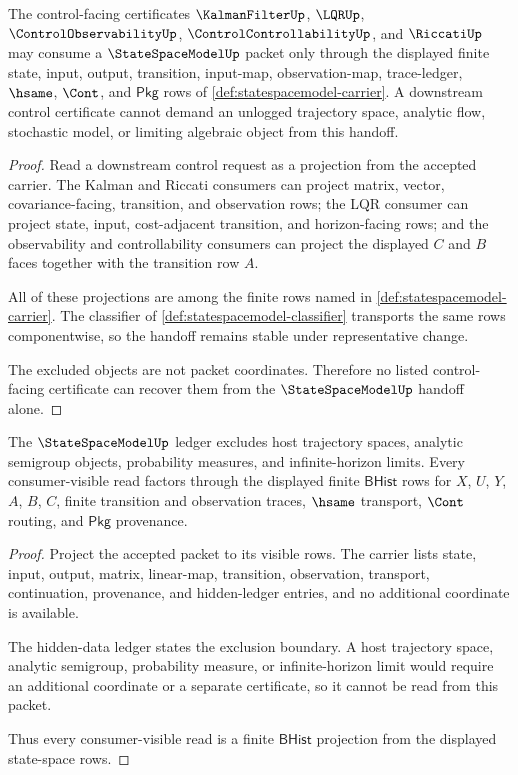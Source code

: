 \begin{theorem}
\label{thm:statespacemodel-control-handoff}
The control-facing certificates $\KalmanFilterUp$, $\LQRUp$, $\ControlObservabilityUp$, $\ControlControllabilityUp$, and $\RiccatiUp$ may consume a $\StateSpaceModelUp$ packet only through the displayed finite state, input, output, transition, input-map, observation-map, trace-ledger, $\hsame$, $\Cont$, and $\mathsf{Pkg}$ rows of \autoref{def:statespacemodel-carrier}. A downstream control certificate cannot demand an unlogged trajectory space, analytic flow, stochastic model, or limiting algebraic object from this handoff.
\end{theorem}
\begin{proof}
Read a downstream control request as a projection from the accepted carrier. The Kalman and Riccati consumers can project matrix, vector, covariance-facing, transition, and observation rows; the LQR consumer can project state, input, cost-adjacent transition, and horizon-facing rows; and the observability and controllability consumers can project the displayed $C$ and $B$ faces together with the transition row $A$.

All of these projections are among the finite rows named in \autoref{def:statespacemodel-carrier}. The classifier of \autoref{def:statespacemodel-classifier} transports the same rows componentwise, so the handoff remains stable under representative change.

The excluded objects are not packet coordinates. Therefore no listed control-facing certificate can recover them from the $\StateSpaceModelUp$ handoff alone.
\end{proof}

\begin{theorem}
\label{thm:statespacemodel-ledger-boundary}
The $\StateSpaceModelUp$ ledger excludes host trajectory spaces, analytic semigroup objects, probability measures, and infinite-horizon limits. Every consumer-visible read factors through the displayed finite $\mathsf{BHist}$ rows for $X$, $U$, $Y$, $A$, $B$, $C$, finite transition and observation traces, $\hsame$ transport, $\Cont$ routing, and $\mathsf{Pkg}$ provenance.
\end{theorem}
\begin{proof}
Project the accepted packet to its visible rows. The carrier lists state, input, output, matrix, linear-map, transition, observation, transport, continuation, provenance, and hidden-ledger entries, and no additional coordinate is available.

The hidden-data ledger states the exclusion boundary. A host trajectory space, analytic semigroup, probability measure, or infinite-horizon limit would require an additional coordinate or a separate certificate, so it cannot be read from this packet.

Thus every consumer-visible read is a finite $\mathsf{BHist}$ projection from the displayed state-space rows.
\end{proof}

